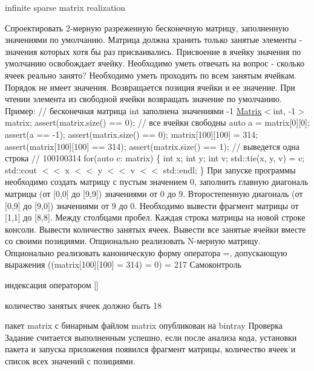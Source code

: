 infinite sparse matrix realization

Спроектировать 2-\/мерную разреженную бесконечную матрицу, заполненную значениями по умолчанию. Матрица должна хранить только занятые элементы -\/ значения которых хотя бы раз присваивались. Присвоение в ячейку значения по умолчанию освобождает ячейку. Необходимо уметь отвечать на вопрос -\/ сколько ячеек реально занято? Необходимо уметь проходить по всем занятым ячейкам. Порядок не имеет значения. Возвращается позиция ячейки и ее значение. При чтении элемента из свободной ячейки возвращать значение по умолчанию. Пример\+: // бесконечная матрица int заполнена значениями -\/1 \mbox{\hyperlink{classMatrix}{Matrix}}$<$int, -\/1$>$ matrix; assert(matrix.\+size() == 0); // все ячейки свободны auto a = matrix\mbox{[}0\mbox{]}\mbox{[}0\mbox{]}; assert(a == -\/1); assert(matrix.\+size() == 0); matrix\mbox{[}100\mbox{]}\mbox{[}100\mbox{]} = 314; assert(matrix\mbox{[}100\mbox{]}\mbox{[}100\mbox{]} == 314); assert(matrix.\+size() == 1); // выведется одна строка // 100100314 for(auto c\+: matrix) \{ int x; int y; int v; std\+::tie(x, y, v) = c; std\+::cout $<$$<$ x $<$$<$ y $<$$<$ v $<$$<$ std\+::endl; \} При запуске программы необходимо создать матрицу с пустым значением 0, заполнить главную диагональ матрицы (от \mbox{[}0,0\mbox{]} до \mbox{[}9,9\mbox{]}) значениями от 0 до 9. Второстепенную диагональ (от \mbox{[}0,9\mbox{]} до \mbox{[}9,0\mbox{]}) значениями от 9 до 0. Необходимо вывести фрагмент матрицы от \mbox{[}1,1\mbox{]} до \mbox{[}8,8\mbox{]}. Между столбцами пробел. Каждая строка матрицы на новой строке консоли. Вывести количество занятых ячеек. Вывести все занятые ячейки вместе со своими позициями. Опционально реализовать N-\/мерную матрицу. Опционально реализовать каноническую форму оператора {\ttfamily =}, допускающую выражения {\ttfamily ((matrix\mbox{[}100\mbox{]}\mbox{[}100\mbox{]} = 314) = 0) = 217} Самоконтроль
\begin{DoxyItemize}
\item индексация оператором {\ttfamily \mbox{[}\mbox{]}}
\item количество занятых ячеек должно быть 18
\item пакет {\ttfamily matrix} с бинарным файлом {\ttfamily matrix} опубликован на bintray Проверка Задание считается выполненным успешно, если после анализа кода, установки пакета и запуска приложения появился фрагмент матрицы, количество ячеек и список всех значений с позициями. 
\end{DoxyItemize}